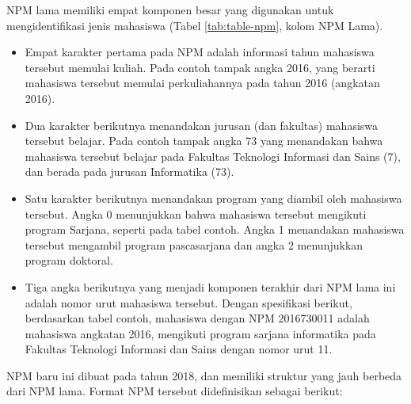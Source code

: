     NPM lama memiliki empat komponen besar yang digunakan untuk mengidentifikasi
    jenis mahasiswa (Tabel \ref{tab:table-npm}, kolom NPM Lama). 
    \begin{itemize}
        \item Empat karakter pertama pada NPM adalah informasi tahun mahasiswa
        tersebut memulai kuliah. Pada contoh tampak angka 2016, yang berarti
        mahasiswa tersebut memulai perkuliahannya pada tahun 2016 (angkatan 2016). 
        
        \item Dua karakter berikutnya menandakan jurusan (dan fakultas) mahasiswa
        tersebut belajar. Pada contoh tampak angka 73 yang menandakan bahwa
        mahasiswa tersebut belajar pada Fakultas Teknologi Informasi dan Sains (7),
        dan berada pada jurusan Informatika (73). 
        
        \item Satu karakter berikutnya menandakan program yang diambil oleh
        mahasiswa tersebut. Angka 0 menunjukkan bahwa mahasiswa tersebut mengikuti
        program Sarjana, seperti pada tabel contoh. Angka 1 menandakan mahasiswa
        tersebut mengambil program pascasarjana dan angka 2 menunjukkan program
        doktoral. 
        
        \item Tiga angka berikutnya yang menjadi komponen terakhir dari NPM lama ini
        adalah nomor urut mahasiswa tersebut. Dengan spesifikasi berikut,
        berdasarkan tabel contoh, mahasiswa dengan NPM 2016730011 adalah mahasiswa
        angkatan 2016, mengikuti program sarjana informatika pada Fakultas Teknologi
        Informasi dan Sains dengan nomor urut 11.
    \end{itemize}
    
    NPM baru ini dibuat pada tahun 2018, dan memiliki struktur yang jauh berbeda
    dari NPM lama. Format NPM tersebut didefinisikan sebagai berikut:
    
